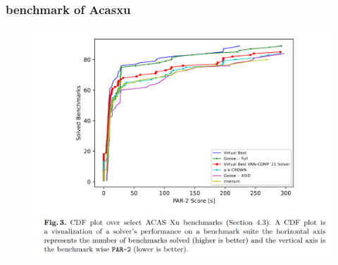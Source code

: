 \documentclass[aspectratio=169%
,serif,mathserif]{beamer}
\begin{document}
\begin{frame}
	\frametitle{benchmark of Acasxu}

	\begin{figure}[htbp]
		\includegraphics[width=.53\linewidth]{6.png}
	\end{figure}
\end{frame}











\begin{frame}
\hfill
{}
\linespread{3}\selectfont
\end{frame}
\end{document}
